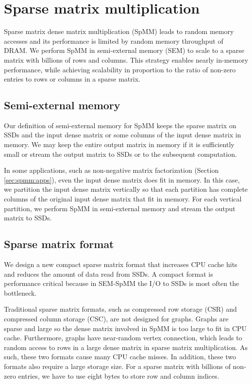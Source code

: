 \section{Sparse matrix multiplication} \label{sec:spmm}
Sparse matrix dense matrix multiplication (SpMM) leads to random memory
accesses and its performance is limited by random memory throughput
of DRAM. We perform SpMM in semi-external memory (SEM)
to scale to a sparse matrix with billions of rows and columns. This strategy enables
nearly in-memory performance, while achieving scalability in proportion
to the ratio of non-zero entries to rows or columns in a sparse matrix.

\subsection{Semi-external memory}
Our definition of semi-external memory for SpMM keeps the sparse matrix on
SSDs and the input dense matrix or some columns of the input dense matrix
in memory. We may keep the entire output matrix in memory if it is sufficiently
small or stream the output matrix to SSDs or to the subsequent computation.

In some applications, such as non-negative matrix factorization (Section
\ref{sec:spmm:apps}), even the input dense matrix does fit in memory. In this case,
we partition the input dense matrix vertically so that each partition has
complete columns of the original input dense matrix that fit in memory.
For each vertical partition, we perform SpMM in semi-external memory and
stream the output matrix to SSDs.

\subsection{Sparse matrix format}
We design a new compact sparse matrix format that increases CPU cache hits and 
reduces the amount of data read from SSDs. A compact format is performance critical 
because in SEM-SpMM the I/O to SSDs is most often the bottleneck.

Traditional sparse matrix formats, such as compressed row storage (CSR) and
compressed column storage (CSC), are not designed for graphs. Graphs are sparse
and large so the dense matrix involved in SpMM is too large to fit in CPU
cache. Furthermore, graphs have near-random vertex connection, which
leads to random access to rows in a large dense matrix in sparse matrix
multiplication. As such, these two formats cause
many CPU cache misses. In addition, these two formats also require a large
storage size. For a sparse matrix with billions of non-zero entries, we have to
use eight bytes to store row and column indices.

